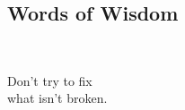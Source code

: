 \documentclass[xga]{xdvislides}
\begin{document}
%
%

\subsection{Words of Wisdom}
\\

\newcommand{\gargantuan}{\fontsize{60}{65}\selectfont}
\gargantuan
\begin{center}
Don't try to fix \\
what isn't broken.
\end{center}
\Normalsize
\end{document}
